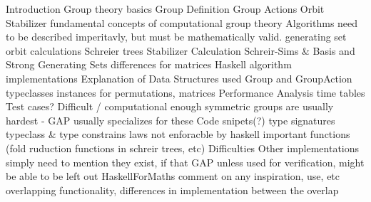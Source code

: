 \documentclass{article}
\begin{document}

\begin{outline}
    \1 Introduction
    \1 Group theory basics
        \2 Group Definition
        \2 Group Actions
            \3 Orbit
            \3 Stabilizer
    \1 fundamental concepts of computational group theory
        \2 Algorithms need to be described imperitavly, but must be mathematically valid.
        \2 generating set
        \2 orbit calculations
        \2 Schreier trees
        \2 Stabilizer Calculation
        \2 Schreir-Sims \& Basis and Strong Generating Sets
        \2 differences for matrices
    \1 Haskell algorithm implementations
        \2 Explanation of Data Structures used
        \2 Group and GroupAction typeclasses
            \3 instances for permutations, matrices
        \2 Performance Analysis
            \3 time tables
            \3 Test cases?
                \4 Difficult / computational enough
                \4 symmetric groups are usually hardest - GAP usually specializes for these
        \2 Code snipets(?)
            \3 type signatures
            \3 typeclass \& type constrains
                \4 laws not enforacble by haskell
            \3 important functions (fold ruduction functions in schreir trees, etc)
        \2 Difficulties
    \1 Other implementations
        \2 simply need to mention they exist, if that
        \2 GAP
            \3 unless used for verification, might be able to be left out
        \2 HaskellForMaths
            \3 comment on any inspiration, use, etc
            \3 overlapping functionality, differences in implementation between the overlap
\end{outline}
\end{document}
